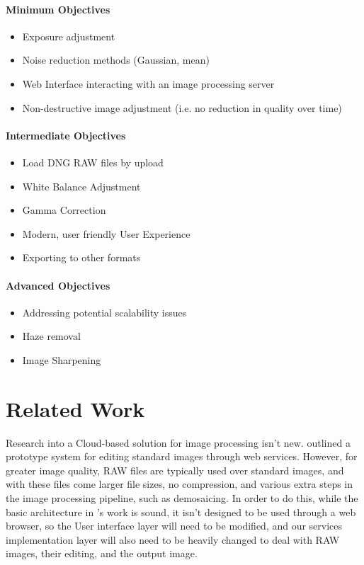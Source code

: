 \documentclass[10pt,a4paper]{article}
\begin{document}
\paragraph{Minimum Objectives}
    \begin{itemize}
      \item Exposure adjustment
      \item Noise reduction methods (Gaussian, mean)
      \item Web Interface interacting with an image processing server
      \item Non-destructive image adjustment (i.e. no reduction in quality over time)
    \end{itemize}
\paragraph{Intermediate Objectives}
    \begin{itemize}
      \item Load DNG RAW files by upload
      \item White Balance Adjustment
      \item Gamma Correction
      \item Modern, user friendly User Experience
      \item Exporting to other formats
    \end{itemize}
\paragraph{Advanced Objectives}
    \begin{itemize}
      \item Addressing potential scalability issues
      \item Haze removal
      \item Image Sharpening
    \end{itemize}
\section{Related Work}
Research into a Cloud-based solution for image processing isn't new. \cite{WebServiceImageProcessing} outlined a prototype
system for editing standard images through web services. However, for greater image quality, RAW files are typically used
over standard images, and with these files come larger file sizes, no compression, and various extra steps in the image processing
pipeline, such as demosaicing. In order to do this, while the basic architecture in \citeauthor{WebServiceImageProcessing}'s work is sound,
it isn't designed to be used through a web browser, so the User interface layer will need to be modified, and our services implementation layer
will also need to be heavily changed to deal with RAW images, their editing, and the output image.
\end{document}
